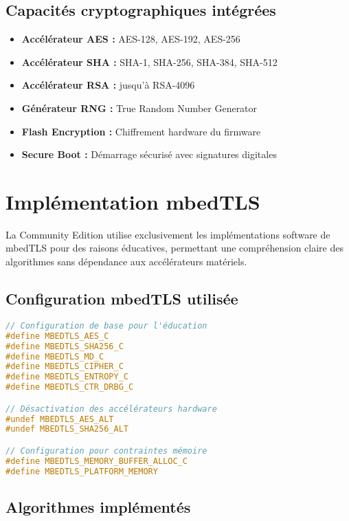 \subsection{Capacités cryptographiques intégrées}

\begin{itemize}
    \item \textbf{Accélérateur AES :} AES-128, AES-192, AES-256
    \item \textbf{Accélérateur SHA :} SHA-1, SHA-256, SHA-384, SHA-512
    \item \textbf{Accélérateur RSA :} jusqu'à RSA-4096
    \item \textbf{Générateur RNG :} True Random Number Generator
    \item \textbf{Flash Encryption :} Chiffrement hardware du firmware
    \item \textbf{Secure Boot :} Démarrage sécurisé avec signatures digitales
\end{itemize}

\section{Implémentation mbedTLS}

La Community Edition utilise exclusivement les implémentations software de mbedTLS pour des raisons éducatives, permettant une compréhension claire des algorithmes sans dépendance aux accélérateurs matériels.

\subsection{Configuration mbedTLS utilisée}

\begin{lstlisting}[language=C, caption=Configuration mbedTLS Community]
// Configuration de base pour l'éducation
#define MBEDTLS_AES_C
#define MBEDTLS_SHA256_C  
#define MBEDTLS_MD_C
#define MBEDTLS_CIPHER_C
#define MBEDTLS_ENTROPY_C
#define MBEDTLS_CTR_DRBG_C

// Désactivation des accélérateurs hardware 
#undef MBEDTLS_AES_ALT
#undef MBEDTLS_SHA256_ALT

// Configuration pour contraintes mémoire
#define MBEDTLS_MEMORY_BUFFER_ALLOC_C
#define MBEDTLS_PLATFORM_MEMORY
\end{lstlisting}

\subsection{Algorithmes implémentés}

